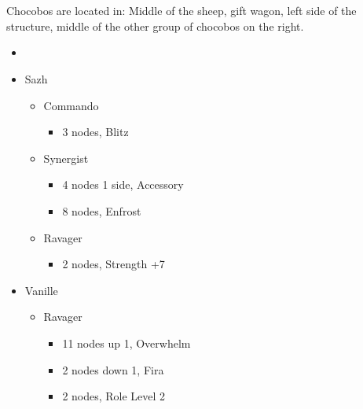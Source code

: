 \chapter[Chapter 8]{}

\begin{multicols}{2}
Chocobos are located in: Middle of the sheep, gift wagon, left side of the structure, middle of the other group of chocobos on the right. 
\begin{menu}
\begin{itemize}
    \paradigm
    \begin{itemize}
        \item {}%
{\paradigmline[1]{\textit{\com}}{\textit{\rav}}{}}%
{\paradigmline{(\com)}{(\med)}{}}%
{\paradigmline{\syn}{\sab}{}}%
{\paradigmline{\rav}{\rav}{}}%
{\paradigmline{\rav}{\sab}{}}%
{\paradigmline{\com}{\sab}{}}
    \end{itemize}
    \crystarium
    \begin{itemize}
        \item Sazh
        \begin{itemize}
            \item Commando
            \begin{itemize}
                \item 3 nodes, Blitz
            \end{itemize}
            \item Synergist
            \begin{itemize}
                \item 4 nodes 1 side, Accessory
                \item 8 nodes, Enfrost
            \end{itemize}
            \item Ravager
            \begin{itemize}
                \item 2 nodes, Strength +7
            \end{itemize}
        \end{itemize}
        \item Vanille
        \begin{itemize}
            \item Ravager
            \begin{itemize}
                \item 11 nodes up 1, Overwhelm
                \item 2 nodes down 1, Fira
                \item 2 nodes, Role Level 2

\end{itemize}
\end{itemize}
\end{itemize}
\end{itemize}
\end{menu}
\end{multicols}
